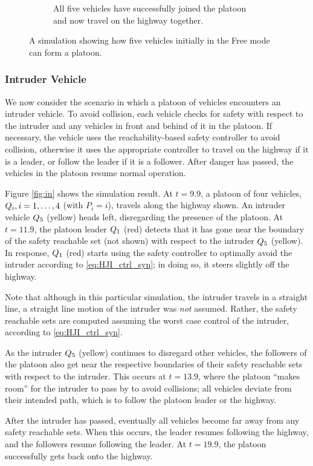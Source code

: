 \begin{figure}
\begin{subfigure}[t]{0.45\textwidth}
        \caption{All five vehicles have successfully joined the platoon and now travel on the highway together.}
    \end{subfigure}   
    \caption{A simulation showing how five vehicles initially in the Free mode can form a platoon. \label{fig:fp}}
\end{figure}

\subsubsection{Intruder Vehicle}
We now consider the scenario in which a platoon of vehicles encounters an intruder vehicle. To avoid collision, each vehicle checks for safety with respect to the intruder and any vehicles in front and behind of it in the platoon. If necessary, the vehicle uses the reachability-based safety controller to avoid collision, otherwise it uses the appropriate controller to travel on the highway if it is a leader, or follow the leader if it is a follower. After danger has passed, the vehicles in the platoon resume normal operation.

Figure \ref{fig:in} shows the simulation result. At $t=9.9$, a platoon of four vehicles, $Q_{i},i=1,\ldots,4$ (with $P_i = i$), travels along the highway shown. An intruder vehicle $Q_{5}$ (yellow) heads left, disregarding the presence of the platoon. At $t=11.9$, the platoon leader $Q_{1}$ (red) detects that it has gone near the boundary of the safety reachable set (not shown) with respect to the intruder $Q_{5}$ (yellow). In response, $Q_{1}$ (red) starts using the safety controller to optimally avoid the intruder according to \eqref{eq:HJI_ctrl_syn}; in doing so, it steers slightly off the highway. 

Note that although in this particular simulation, the intruder travels in a straight line, a straight line motion of the intruder was \textit{not} assumed. Rather, the safety reachable sets are computed assuming the worst case control of the intruder, according to \eqref{eq:HJI_ctrl_syn}.

As the intruder $Q_{5}$ (yellow) continues to disregard other vehicles, the followers of the platoon also get near the respective boundaries of their safety reachable sets with respect to the intruder. This occurs at $t=13.9$, where the platoon ``makes room'' for the intruder to pass by to avoid collisions; all vehicles deviate from their intended path, which is to follow the platoon leader or the highway.

After the intruder has passed, eventually all vehicles become far away from any safety reachable sets. When this occurs, the leader resumes following the highway, and the followers resume following the leader. At $t=19.9$, the platoon successfully gets back onto the highway.

